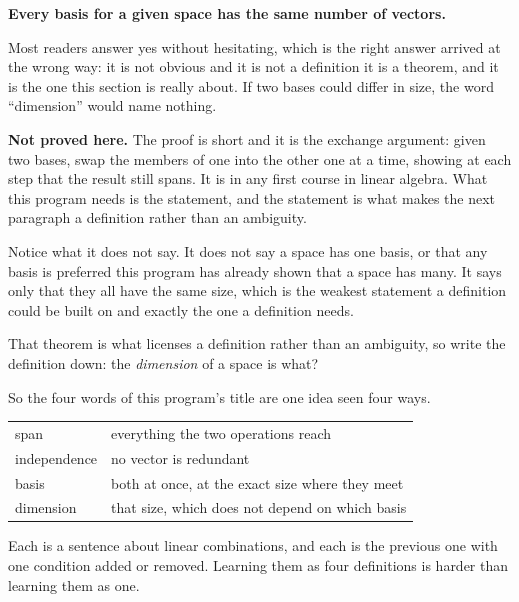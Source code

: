 \begin{fr}

\medskip
\noindent
\textbf{Every basis for a given space has the same number of vectors.}

\medskip
\noindent
Most readers answer yes without hesitating, which is the right answer arrived
at the wrong way: it is not obvious and it is not a definition \dash{} it is a
theorem, and it is the one this section is really about. If two bases could
differ in size, the word \enquote{dimension} would name nothing.

\begin{rigourbox}
\textbf{Not proved here.} The proof is short and it is the exchange argument:
given two bases, swap the members of one into the other one at a time, showing
at each step that the result still spans. It is in any first course in linear
algebra. What this program needs is the statement, and the statement is what
makes the next paragraph a definition rather than an ambiguity.
\end{rigourbox}

Notice what it does not say. It does not say a space has one basis, or that
any basis is preferred \dash{} this program has already shown that a space has
many. It says only that they all have the same size, which is the weakest
statement a definition could be built on and exactly the one a definition
needs.

That theorem is what licenses a definition rather than an ambiguity, so write
the definition down: the \emph{dimension} of a space is what?
\dotline
\nextframe
\end{fr}

\begin{fr}

So the four words of this program's title are one idea seen four ways.

\begin{center}
\begin{tabularx}{\linewidth}{@{}lX@{}}
\toprule
span & everything the two operations reach \\
independence & no vector is redundant \\
basis & both at once, at the exact size where they meet \\
dimension & that size, which does not depend on which basis \\
\bottomrule
\end{tabularx}
\end{center}

Each is a sentence about linear combinations, and each is the previous one with
one condition added or removed. Learning them as four definitions is harder
than learning them as one.
\end{fr}


